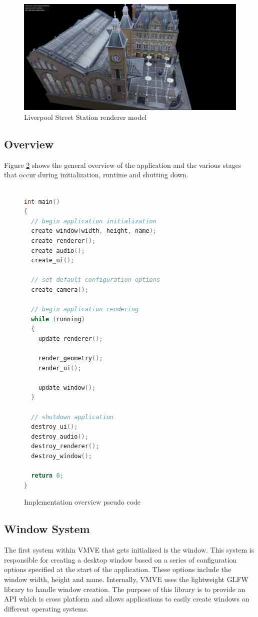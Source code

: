 \documentclass[11pt]{article}
\begin{document}
\begin{figure}[h!]
  \centering
  \includegraphics[width=\textwidth]{images/rendering.png}
  \caption{Liverpool Street Station renderer model}
  \label{fig:renderer}
\end{figure}


\subsection{Overview}
Figure \ref{fig:overview_pseudo_code} shows the general overview of the application and the various 
stages that occur during initialization, runtime and shutting down.


\begin{figure}[ht]
\centering
\begin{lstlisting}[language=C++]

int main()
{
  // begin application initialization
  create_window(width, height, name);
  create_renderer();
  create_audio();
  create_ui();

  // set default configuration options
  create_camera();
  
  // begin application rendering
  while (running)
  {
    update_renderer();

    render_geometry();
    render_ui();

    update_window();
  }

  // shutdown application
  destroy_ui();
  destroy_audio();
  destroy_renderer();
  destroy_window();

  return 0;
}
\end{lstlisting}
\caption{Implementation overview pseudo code}
\label{fig:overview_pseudo_code}
\end{figure}

  

\subsection{Window System}
The first system within VMVE that gets initialized is the window. This system is
responsible for creating a desktop window based on a series of configuration
options specified at the start of the application. These options include the
window width, height and name. Internally, VMVE uses the lightweight GLFW
library to handle window creation. The purpose of this library is to provide an
API which is cross platform and allows applications to easily create windows on
different operating systems. 
\end{document}
